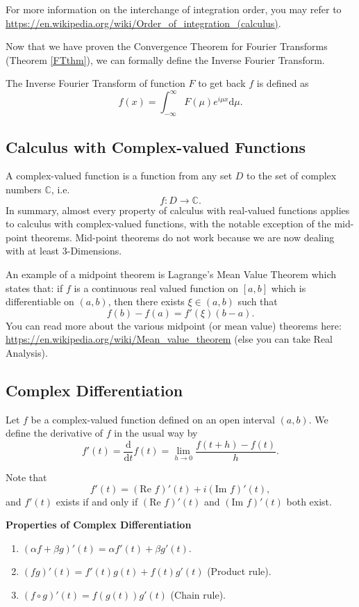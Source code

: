 For more information on the interchange of integration order, you may refer to \url{https://en.wikipedia.org/wiki/Order_of_integration_(calculus)}.

Now that we have proven the Convergence Theorem for Fourier Transforms (Theorem \ref{FTthm}), we can formally define the Inverse Fourier Transform.

\begin{defn}
The Inverse Fourier Transform of function $F$ to get back $f$ is defined as
$$f(x) = \int_{-\infty}^{\infty}F(\mu)e^{i\mu x}\mathrm{d}\mu.$$
\end{defn}

\subsection{Calculus with Complex-valued Functions}
A complex-valued function is a function from any set $D$ to the set of complex numbers $\mathbb{C}$, i.e.
$$f:D\rightarrow\mathbb{C}.$$
In summary, almost every property of calculus with real-valued functions applies to calculus with complex-valued functions, with the notable exception of the mid-point theorems. Mid-point theorems do not work because we are now dealing with at least $3$-Dimensions.

An example of a midpoint theorem is Lagrange's Mean Value Theorem which states that: if $f$ is a continuous real valued function on $[a, b]$ which is
differentiable on $(a, b)$, then there exists $\xi \in (a, b)$ such that
$$f(b) - f(a) = f'(\xi)(b-a).$$
You can read more about the various midpoint (or mean value) theorems here: \url{https://en.wikipedia.org/wiki/Mean_value_theorem} (else you can take Real Analysis).

\subsection{Complex Differentiation}
\begin{defn}
Let $f$ be a complex-valued function defined on an open interval $(a,b)$. We define the
derivative of $f$ in the usual way by
$$f'(t) = \frac{\mathrm{d}}{\mathrm{d}t}f(t) = \lim_{h\rightarrow0}\frac{f(t+h) - f(t)}{h}.$$
\end{defn}
Note that
$$f'(t) = (\mbox{Re } f )'(t)+i (\mbox{Im }f )'(t),$$
and $f'(t)$ exists if and only if $(\mbox{Re }f )'(t)$ and $(\mbox{Im }f )'(t)$ both exist.
\medskip

\textbf{Properties of Complex Differentiation}
\begin{enumerate}
    \item $(\alpha f + \beta g)'(t) = \alpha f' (t) + \beta g' (t)$.
    \item $(fg)'(t) = f' (t) g (t) + f (t) g' (t)$ (Product rule).
    \item $(f \circ g)'(t) = f(g(t))g'(t)$ (Chain rule).
\end{enumerate}

